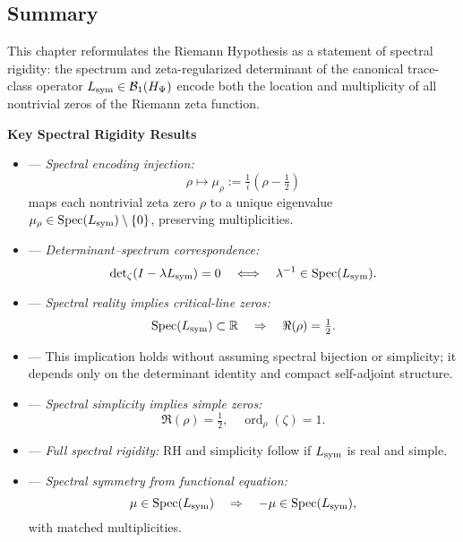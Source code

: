 \subsection*{Summary}

This chapter reformulates the Riemann Hypothesis as a statement of spectral rigidity: the spectrum and zeta-regularized determinant of the canonical trace-class operator \( L_{\mathrm{sym}} \in \mathcal{B}_1(H_{\Psi}) \) encode both the location and multiplicity of all nontrivial zeros of the Riemann zeta function.

\textbf{Key Spectral Rigidity Results}
\begin{itemize}
  \item {} — \textit{Spectral encoding injection:}
  \[
  \rho \mapsto \mu_\rho := \tfrac{1}{i}(\rho - \tfrac{1}{2})
  \]
  maps each nontrivial zeta zero \( \rho \) to a unique eigenvalue \( \mu_\rho \in \operatorname{Spec}(L_{\mathrm{sym}}) \setminus \{0\} \), preserving multiplicities.

  \item {} — \textit{Determinant–spectrum correspondence:}
  \[
  \det\nolimits_{\zeta}(I - \lambda L_{\mathrm{sym}}) = 0 \quad \Longleftrightarrow \quad \lambda^{-1} \in \operatorname{Spec}(L_{\mathrm{sym}}).
  \]

  \item {} — \textit{Spectral reality implies critical-line zeros:}
  \[
  \operatorname{Spec}(L_{\mathrm{sym}}) \subset \mathbb{R} \quad \Rightarrow \quad \Re(\rho) = \tfrac{1}{2}.
  \]

  \item {} — This implication holds without assuming spectral bijection or simplicity; it depends only on the determinant identity and compact self-adjoint structure.

  \item {} — \textit{Spectral simplicity implies simple zeros:}
  \[
  \Re(\rho) = \tfrac{1}{2}, \quad \operatorname{ord}_\rho(\zeta) = 1.
  \]

  \item {} — \textit{Full spectral rigidity:} RH and simplicity follow if \( L_{\mathrm{sym}} \) is real and simple.

  \item {} — \textit{Spectral symmetry from functional equation:}
  \[
  \mu \in \operatorname{Spec}(L_{\mathrm{sym}}) \quad \Rightarrow \quad -\mu \in \operatorname{Spec}(L_{\mathrm{sym}}),
  \]
  with matched multiplicities.


\end{itemize}
